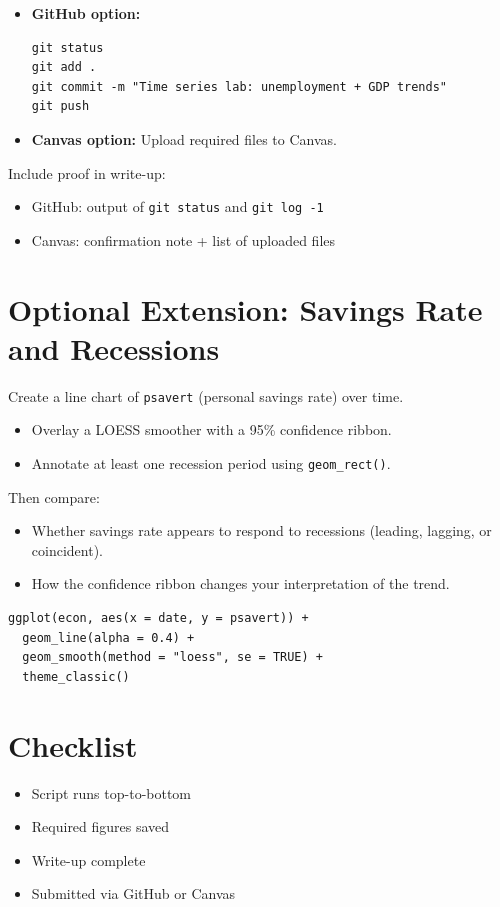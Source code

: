 \documentclass[11pt]{article}
\begin{document}
\begin{enumerate}
\begin{itemize}
  \item \textbf{GitHub option:}
\begin{verbatim}
git status
git add .
git commit -m "Time series lab: unemployment + GDP trends"
git push
\end{verbatim}

  \item \textbf{Canvas option:}
  Upload required files to Canvas.
\end{itemize}

Include proof in write-up:
\begin{itemize}
  \item GitHub: output of \texttt{git status} and \texttt{git log -1}
  \item Canvas: confirmation note + list of uploaded files
\end{itemize}

\end{enumerate}

\section*{Optional Extension: Savings Rate and Recessions}

Create a line chart of \texttt{psavert} (personal savings rate) over time.
\begin{itemize}
  \item Overlay a LOESS smoother with a 95\% confidence ribbon.
  \item Annotate at least one recession period using \texttt{geom\_rect()}.
\end{itemize}

Then compare:
\begin{itemize}
  \item Whether savings rate appears to respond to recessions (leading, lagging, or coincident).
  \item How the confidence ribbon changes your interpretation of the trend.
\end{itemize}

\begin{verbatim}
ggplot(econ, aes(x = date, y = psavert)) +
  geom_line(alpha = 0.4) +
  geom_smooth(method = "loess", se = TRUE) +
  theme_classic()
\end{verbatim}

\section*{Checklist}
\begin{itemize}
  \item Script runs top-to-bottom
  \item Required figures saved
  \item Write-up complete
  \item Submitted via GitHub or Canvas
\end{itemize}
\end{document}
